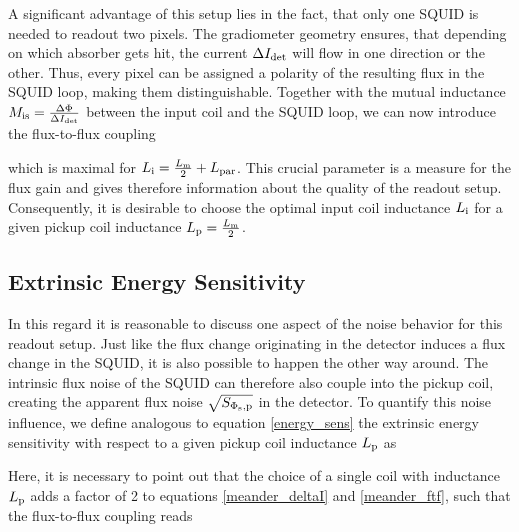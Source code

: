 
A significant advantage of this setup lies in the fact, that only one SQUID is needed to readout two pixels. The gradiometer geometry ensures, that depending on which absorber gets hit, the current $\Delta I_{\rm det}$ will flow in one direction or the other. Thus, every pixel can be assigned a polarity of the resulting flux in the SQUID loop, making them distinguishable. Together with the mutual inductance $M_{\rm is}=\frac{\Delta\Phi}{\Delta I_{\rm det}}$ between the input coil and the SQUID loop, we can now introduce the flux-to-flux coupling 


which is maximal for $L_{\rm i}=\frac{L_{\rm m}}{2}+L_{\rm par}$. This crucial parameter is a measure for the flux gain and gives therefore information about the quality of the readout setup. Consequently, it is desirable to choose the optimal input coil inductance $L_{\rm i}$ for a given pickup coil inductance $L_{\rm p}=\frac{L_{\rm m}}{2}$.

\subsection{Extrinsic Energy Sensitivity}\label{subsec_extr_sens_theo}

In this regard it is reasonable to discuss one aspect of the noise behavior for this readout setup. Just like the flux change originating in the detector induces a flux change in the SQUID, it is also possible to happen the other way around. The intrinsic flux noise of the SQUID can therefore also couple into the pickup coil, creating the apparent flux noise $\sqrt{S_{\rm\Phi_{\rm s},p}}$ in the detector. To quantify this noise influence, we define analogous to equation \ref{energy_sens} the extrinsic energy sensitivity with respect to a given pickup coil inductance $L_{\rm p}$ as \cite{Knuutila1988}


Here, it is necessary to point out that the choice of a single coil with inductance $L_{\rm p}$ adds a factor of 2 to equations \ref{meander_deltaI} and \ref{meander_ftf}, such that the flux-to-flux coupling reads


